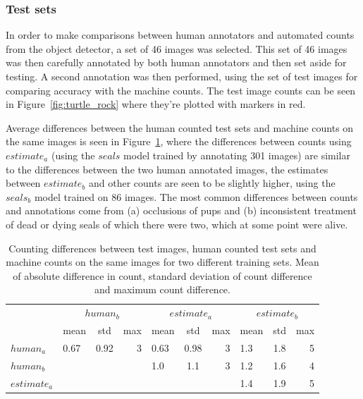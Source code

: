 \subsubsection{Test sets}

In order to make comparisons between human annotators and automated counts from the object detector, a set of 46 images was selected. This set of 46 images was then carefully annotated by both human annotators and then set aside for testing. A second annotation was then performed, using the set of test images for comparing accuracy with the machine counts. The test image counts can be seen in Figure~\ref{fig:turtle_rock} where they're plotted with markers in red. 

Average differences between the human counted test sets and machine counts on the same images is seen in Figure~\ref{tab:test_comparison}, where the differences between counts using $estimate_a$ (using the $seals$ model trained by annotating 301 images) are similar to the differences between the two human annotated images, the estimates between $estimate_b$ and other counts are seen to be slightly higher, using the $seals_b$ model trained on 86 images. The most common differences between counts and annotations come from (a) occlusions of pups and (b) inconsistent treatment of dead or dying seals of which there were two, which at some point were alive.

\begin{table}[tbh!]
    \centering
\caption{Counting differences between test images, human counted test sets and machine counts on the same images for two different training sets. Mean of absolute difference in count, standard deviation of count difference and maximum count difference. }    
\label{tab:test_comparison} 
\begin{tabular}{l | lcr | lcr | lcr | }
 &  \multicolumn{3}{c|}{$human_b$} &  \multicolumn{3}{c|}{$estimate_a$} &  \multicolumn{3}{c|}{$estimate_b$} \\
 &  mean & std & max &  mean & std & max &  mean & std & max \\
\toprule
$human_a$  & 0.67 & 0.92 & 3 & 0.63 & 0.98 & 3 & 1.3 & 1.8 & 5    \\
$human_b$  &      &      &   & 1.0 & 1.1 & 3 & 1.2 & 1.6 & 4 \\
$estimate_a$ &    &      &   &     &     &   & 1.4 & 1.9 & 5  \\
\bottomrule
\end{tabular}
\end{table}

